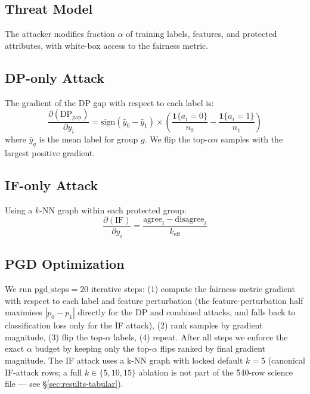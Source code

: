 \subsection{Threat Model}
The attacker modifies fraction $\alpha$ of training labels, features, and protected attributes, with white-box access to the fairness metric.

\subsection{DP-only Attack}
The gradient of the DP gap with respect to each label is:
\begin{equation}
\frac{\partial (\text{DP}_{\text{gap}})}{\partial y_i} = \text{sign}(\bar{y}_0 - \bar{y}_1) \times \left(\frac{\mathbf{1}\{a_i=0\}}{n_0} - \frac{\mathbf{1}\{a_i=1\}}{n_1}\right)
\end{equation}
where $\bar{y}_g$ is the mean label for group $g$. We flip the top-$\alpha n$ samples with the largest positive gradient.

\subsection{IF-only Attack}
Using a $k$-NN graph within each protected group:
\begin{equation}
\frac{\partial (\text{IF})}{\partial y_i} = \frac{\text{agree}_i - \text{disagree}_i}{k_{\text{eff}}}
\end{equation}

\subsection{PGD Optimization}
We run $\mathrm{pgd\_steps}{=}20$ iterative steps: (1) compute the
fairness-metric gradient with respect to each label and feature
perturbation (the feature-perturbation half maximises $|p_0-p_1|$
directly for the DP and combined attacks, and falls back to
classification loss only for the IF attack), (2) rank samples by
gradient magnitude, (3) flip the top-$\alpha$ labels, (4) repeat.
After all steps we enforce the exact $\alpha$ budget by keeping
only the top-$\alpha$ flips ranked by final gradient magnitude.
The IF attack uses a k-NN graph with locked default $k{=}5$
(canonical IF-attack rows; a full $k\in\{5,10,15\}$ ablation is not part
of the 540-row science file --- see \S\ref{sec:results-tabular}).
